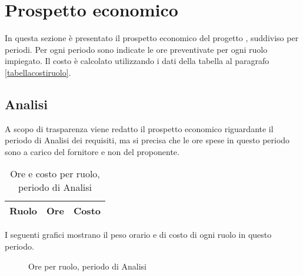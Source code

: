 


\section{Prospetto economico}

In questa sezione è presentato il prospetto economico del progetto \ProjectName{}, suddiviso per periodi. Per ogni periodo sono indicate le ore preventivate per ogni ruolo impiegato.
Il costo è calcolato utilizzando i dati della tabella al paragrafo \ref{tabellacostiruolo}.

\subsection{Analisi}

A scopo di trasparenza viene redatto il prospetto economico riguardante il periodo di Analisi dei requisiti, ma si precisa che le ore spese in questo periodo sono a carico del fornitore e non del proponente.

\begin{table}[H]
	\centering
	\begin{tabular}{ l c c }
	\textbf{Ruolo} & \textbf{Ore} & \textbf{Costo} \\
	\hline
	
	\end{tabular}
	\caption{Ore e costo per ruolo, periodo di Analisi}
	\end{table}

I seguenti grafici mostrano il peso orario e di costo di ogni ruolo in questo periodo.

\begin{figure}[H]
\begin{tikzpicture}

	

\end{tikzpicture}
\caption{Ore per ruolo, periodo di Analisi}
\end{figure}

